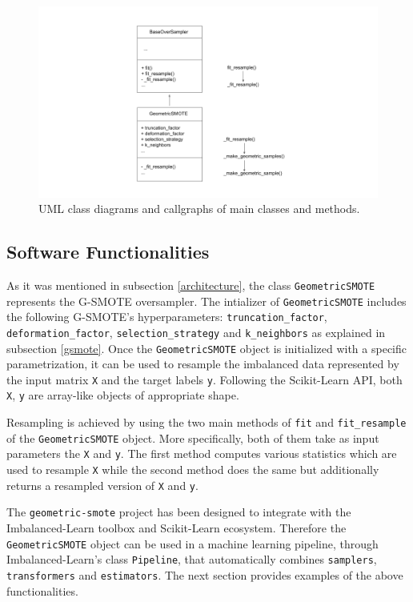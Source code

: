 \documentclass[preprint,12pt, a4paper]{elsarticle}
\begin{document}
\begin{figure}[H]
	\centering
	\includegraphics[width=1\linewidth]{../analysis/class_diagram}
	\caption{UML class diagrams and callgraphs of main classes and methods.}
	\label{fig:class_diagram}
\end{figure}

\subsection{Software Functionalities}
\label{functionality}

As it was mentioned in subsection \ref{architecture}, the class \texttt{GeometricSMOTE} represents the G-SMOTE oversampler. The intializer of \texttt{GeometricSMOTE} includes the following G-SMOTE's hyperparameters: \texttt{truncation\_factor}, \texttt{deformation\_factor}, \texttt{selection\_strategy} and \texttt{k\_neighbors} as explained in subsection \ref{gsmote}. Once the \texttt{GeometricSMOTE} object is initialized with a specific parametrization, it can be used to resample the imbalanced data represented by the input matrix \texttt{X} and the target labels \texttt{y}. Following the Scikit-Learn API, both \texttt{X}, \texttt{y} are array-like objects of appropriate shape.

Resampling is achieved by using the two main methods of \texttt{fit} and \texttt{fit\_resample} of the \texttt{GeometricSMOTE} object. More specifically, both of them take as input parameters the \texttt{X} and \texttt{y}. The first method computes various statistics which are used to resample \texttt{X} while the second method does the same but additionally returns a resampled version of \texttt{X} and \texttt{y}.

The \texttt{geometric-smote} project has been designed to integrate with the Imbalanced-Learn toolbox and Scikit-Learn ecosystem. Therefore the \texttt{GeometricSMOTE} object can be used in a machine learning pipeline, through Imbalanced-Learn's class \texttt{Pipeline}, that automatically combines \texttt{samplers}, \texttt{transformers} and \texttt{estimators}. The next section provides examples of the above functionalities.
\end{document}
